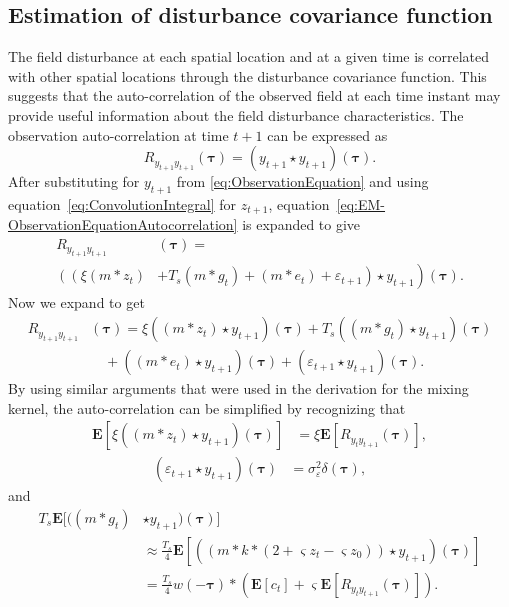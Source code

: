 \documentclass[10pt,twocolumn,twoside]{IEEEtran}
\begin{document}
\subsection{Estimation of disturbance covariance function}
The field disturbance at each spatial location and at a given time is correlated with other spatial locations through the disturbance covariance
function. This suggests that the auto-correlation of the observed field at each time instant may provide useful information about the field disturbance characteristics.
The observation auto-correlation at time $t+1$ can be expressed as
\begin{equation}\label{eq:EM-ObservationEquationAutocorrelation}
	R_{y_{t+1}y_{t+1}}(\boldsymbol{\tau})=(y_{t+1} \star y_{t+1})(\boldsymbol\tau).
\end{equation}
 After substituting for $y_{t+1}$ from \eqref{eq:ObservationEquation} and using equation~\eqref{eq:ConvolutionIntegral}   for $z_{t+1}$,  equation~\eqref{eq:EM-ObservationEquationAutocorrelation} is expanded to give 
\begin{align}\label{eq:EM-expanded_auto_corr}  
	R_{y_{t+1}y_{t+1}} & (\boldsymbol{\tau}) = \\ \nonumber 
	\left( \left(\xi( m\ast z_{t}) \right.\right.&+\left.\left. T_s(m\ast g_{t}) + ( m \ast e_{t})+\varepsilon_{t+1} \right) \star y_{t+1} \right) (\boldsymbol{\tau}).
\end{align}
Now we expand to get
\begin{align}\label{eq:expanded_auto_corr}
	R_{y_{t+1}y_{t+1}}&(\boldsymbol{\tau}) = \xi((m \ast z_{t}) \star y_{t+1})(\boldsymbol{\tau})+T_s((m\ast g_{t})\star y_{t+1})(\boldsymbol{\tau}) \nonumber \\
	&\quad+((m\ast e_{t})\star  y_{t+1})(\boldsymbol{\tau})+(\varepsilon_{t+1} \star y_{t+1})(\boldsymbol{\tau}).
\end{align}
By using similar arguments that were used in the derivation for the mixing kernel, the auto-correlation can be simplified by recognizing that
\begin{align}\label{eq:EM-Autoterm1} 
  \mathbf{E}[\xi((m\ast z_{t})\star y_{t+1})(\boldsymbol{\tau})]&=\xi \mathbf{E}[ R_{y_ty_{t+1}}(\boldsymbol{\tau})],
\end{align}
\begin{align}\label{eq:EM-Autoterm2}
 (\varepsilon_{t+1}\star y_{t+1})(\boldsymbol\tau)&=\sigma_{\varepsilon}^2\delta(\boldsymbol{\tau}),
\end{align} 
and
\begin{align}\label{eq:EM-Autoterm3} 
	T_s\mathbf{E}[((m\ast g_t) &\star y_{t+1})(\boldsymbol\tau)] \nonumber \\ 
	&\approx \frac{T_s}{4}\mathbf{E}[((m \ast k \ast (2 + \varsigma z_t - \varsigma z_0))\star y_{t+1})(\boldsymbol\tau)] \nonumber \\
	&= \frac{T_s}{4} w(-\boldsymbol\tau) \ast (\mathbf{E}\left[c_t\right] + \varsigma \mathbf{E}\left[R_{y_ty_{t+1}}(\boldsymbol\tau)\right] ).
\end{align}
\end{document}
